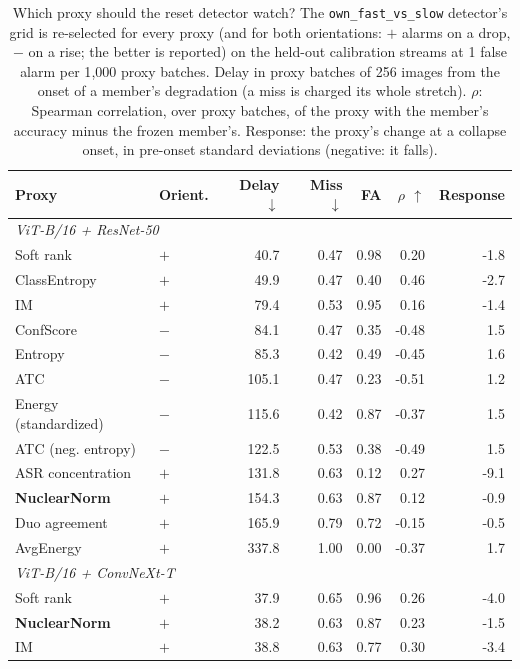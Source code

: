 \begin{table}[t]
\centering
\small
\caption{Which proxy should the reset detector watch? The \texttt{own\_fast\_vs\_slow} detector's grid is re-selected for every proxy (and for both orientations: $+$ alarms on a drop, $-$ on a rise; the better is reported) on the held-out calibration streams at 1 false alarm per 1{,}000 proxy batches. Delay in proxy batches of 256 images from the onset of a member's degradation (a miss is charged its whole stretch). $\rho$: Spearman correlation, over proxy batches, of the proxy with the member's accuracy minus the frozen member's. Response: the proxy's change at a collapse onset, in pre-onset standard deviations (negative: it falls).}
\label{tab:proxy_study}
\begin{tabular}{llrrrrr}
\toprule
Proxy & Orient. & Delay $\downarrow$ & Miss $\downarrow$ & FA & $\rho$ $\uparrow$ & Response \\
\midrule
\multicolumn{7}{l}{\textit{ViT-B/16 + ResNet-50}} \\
Soft rank & $+$ & 40.7 & 0.47 & 0.98 & 0.20 & -1.8 \\
ClassEntropy & $+$ & 49.9 & 0.47 & 0.40 & 0.46 & -2.7 \\
IM & $+$ & 79.4 & 0.53 & 0.95 & 0.16 & -1.4 \\
ConfScore & $-$ & 84.1 & 0.47 & 0.35 & -0.48 & 1.5 \\
Entropy & $-$ & 85.3 & 0.42 & 0.49 & -0.45 & 1.6 \\
ATC & $-$ & 105.1 & 0.47 & 0.23 & -0.51 & 1.2 \\
Energy (standardized) & $-$ & 115.6 & 0.42 & 0.87 & -0.37 & 1.5 \\
ATC (neg. entropy) & $-$ & 122.5 & 0.53 & 0.38 & -0.49 & 1.5 \\
ASR concentration & $+$ & 131.8 & 0.63 & 0.12 & 0.27 & -9.1 \\
\textbf{NuclearNorm} & $+$ & 154.3 & 0.63 & 0.87 & 0.12 & -0.9 \\
Duo agreement & $+$ & 165.9 & 0.79 & 0.72 & -0.15 & -0.5 \\
AvgEnergy & $+$ & 337.8 & 1.00 & 0.00 & -0.37 & 1.7 \\
\midrule
\multicolumn{7}{l}{\textit{ViT-B/16 + ConvNeXt-T}} \\
Soft rank & $+$ & 37.9 & 0.65 & 0.96 & 0.26 & -4.0 \\
\textbf{NuclearNorm} & $+$ & 38.2 & 0.63 & 0.87 & 0.23 & -1.5 \\
IM & $+$ & 38.8 & 0.63 & 0.77 & 0.30 & -3.4 \\

\end{tabular}
\end{table}
